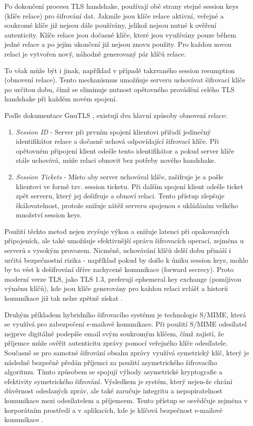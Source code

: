 Po dokončení procesu TLS handshake, používají obě strany stejné session keys (klíče relace) pro šifrování dat. Jakmile jsou klíče relace aktivní, veřejné a soukromé klíče již nejsou dále používány, jelikož nejsou nutné k ověření autenticity. Klíče relace jsou dočasné klíče, které jsou využívány pouze během jedné relace a po jejím ukončení již nejsou znovu použity. Pro každou novou relaci je vytvořen nový, náhodně generovaný pár klíčů relace.

To však může být i jinak, například v případě takzvaného session resumption (obnovení relace). Tento mechanismus umožňuje serveru uchovávat šifrovací klíče po určitou dobu, čímž se eliminuje nutnost opětovného provádění celého TLS handshake při každém novém spojení.

Podle dokumentace GnuTLS \textcite{gnutls2024}, existují dva hlavní způsoby obnovení relace:
\begin {enumerate}
\item \textit{Session ID} - Server při prvním spojení klientovi přiřadí jedinečný identifikátor relace a dočasně uchová odpovídající šifrovací klíče. Při opětovném připojení klient odešle tento identifikátor a pokud server klíče stále uchovává, může relaci obnovit bez potřeby nového handshake.
\item \textit{Session Tickets} - Místo aby server uchovával klíče, zašifruje je a pošle klientovi ve formě tzv. session ticketu. Při dalším spojení klient odešle ticket zpět serveru, který jej dešifruje a obnoví relaci. Tento přístup zlepšuje škálovatelnost, protože snižuje zátěž serveru spojenou s ukládáním velkého množství session keys.
\end {enumerate}

Použití těchto metod nejen zvyšuje výkon a snižuje latenci při opakovaných připojeních, ale také umožňuje efektivnější správu šifrovacích operací, zejména u serverů s vysokým provozem. Nicméně, uchovávání klíčů delší dobu přináší i určitá bezpečnostní rizika - například pokud by došlo k úniku session keys, mohlo by to vést k dešifrování dříve zachycené komunikace (forward secrecy).
Proto moderní verze TLS, jako TLS 1.3, preferují ephemeral key exchange (pomíjivou výměnu klíčů), kde jsou klíče generovány pro každou relaci zvlášť a historii komunikace již tak nelze zpětně získat \parencite {gnutls2024}. 

Druhým příkladem hybridního šifrovacího systému je technologie S/MIME, která se využívá pro zabezpečení e-mailové komunikace. Při použití S/MIME odesílatel nejprve digitálně podepíše email svým soukromým klíčem, čímž zajistí, že příjemce může ověřit autenticitu zprávy pomocí veřejného klíče odesílatele. Současně se pro samotné šifrování obsahu zprávy využívá symetrický klíč, který je následně bezpečně předán příjemci za použití asymetrického šifrovacího algoritmu. Tímto způsobem se spojují výhody asymetrické kryptografie a efektivity symetrického šifrování.
Výsledkem je systém, který nejen-že chrání důvěrnost odeslaných zpráv, ale také zaručuje integritu a nepopiratelnost komunikace mezi odesílatelem a příjemcem. Tento přístup se osvědčuje zejména v korporátním prostředí a v aplikacích, kde je klíčová bezpečnost e-mailové komunikace \parencite{cloudflare2024}.
\newpage